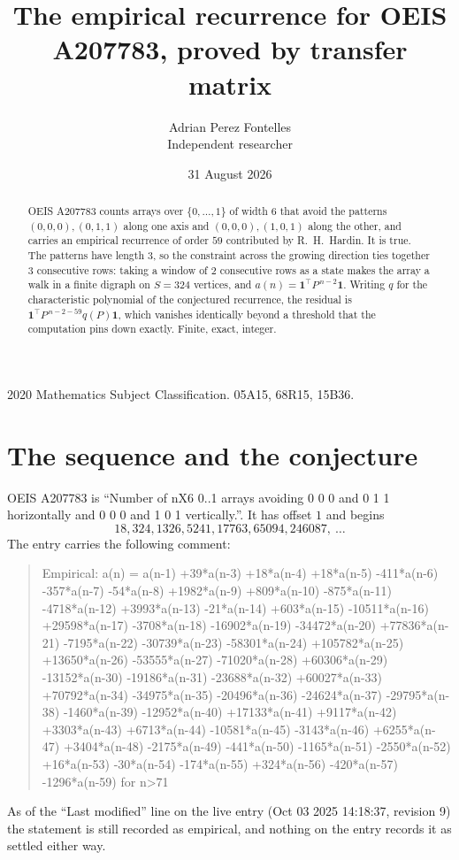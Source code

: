 \documentclass[11pt,a4paper]{article}
\title{The empirical recurrence for OEIS A207783, proved by transfer matrix}
\author{Adrian Perez Fontelles\\ \small Independent researcher}
\date{31 August 2026}
\theoremstyle{plain}
\theoremstyle{definition}
\begin{document}
\maketitle

\begin{abstract}
OEIS A207783 counts arrays over $\{0,\dots,1\}$ of width $6$ that avoid the patterns
$(0,0,0), (0,1,1)$ along one axis and $(0,0,0), (1,0,1)$ along the other, and carries an empirical recurrence of
order $59$ contributed by R.~H.~Hardin. It is true. The patterns have length $3$, so
the constraint across the growing direction ties together $3$ consecutive rows: taking a
window of $2$ consecutive rows as a state makes the array a walk in a finite digraph
on $S=324$ vertices, and $a(n)=\mathbf{1}^{\!\top}P^{\,n-2}\mathbf{1}$. Writing $q$
for the characteristic polynomial of the conjectured recurrence, the residual is
$\mathbf{1}^{\!\top}P^{\,n-2-59}q(P)\mathbf{1}$, which vanishes identically
beyond a threshold that the computation pins down exactly. Finite, exact, integer.
\end{abstract}

\noindent\small 2020 Mathematics Subject Classification. 05A15, 68R15, 15B36.\normalsize

\section{The sequence and the conjecture}

OEIS A207783 is ``Number of nX6 0..1 arrays avoiding 0 0 0 and 0 1 1 horizontally and 0 0 0 and 1 0 1 vertically.''. It has offset
$1$ and begins
\[
18, 324, 1326, 5241, 17763, 65094, 246087,\ \dots
\]
The entry carries the following comment:
\begin{quote}\small
Empirical: a(n) = a(n-1) +39*a(n-3) +18*a(n-4) +18*a(n-5) -411*a(n-6) -357*a(n-7) -54*a(n-8) +1982*a(n-9) +809*a(n-10) -875*a(n-11) -4718*a(n-12) +3993*a(n-13) -21*a(n-14) +603*a(n-15) -10511*a(n-16) +29598*a(n-17) -3708*a(n-18) -16902*a(n-19) -34472*a(n-20) +77836*a(n-21) -7195*a(n-22) -30739*a(n-23) -58301*a(n-24) +105782*a(n-25) +13650*a(n-26) -53555*a(n-27) -71020*a(n-28) +60306*a(n-29) -13152*a(n-30) -19186*a(n-31) -23688*a(n-32) +60027*a(n-33) +70792*a(n-34) -34975*a(n-35) -20496*a(n-36) -24624*a(n-37) -29795*a(n-38) -1460*a(n-39) -12952*a(n-40) +17133*a(n-41) +9117*a(n-42) +3303*a(n-43) +6713*a(n-44) -10581*a(n-45) -3143*a(n-46) +6255*a(n-47) +3404*a(n-48) -2175*a(n-49) -441*a(n-50) -1165*a(n-51) -2550*a(n-52) +16*a(n-53) -30*a(n-54) -174*a(n-55) +324*a(n-56) -420*a(n-57) -1296*a(n-59) for n>71
\end{quote}
As of the ``Last modified'' line on the live entry (Oct 03 2025 14:18:37, revision
9) the statement is still recorded as empirical, and nothing on the entry
records it as settled either way.
\end{document}
